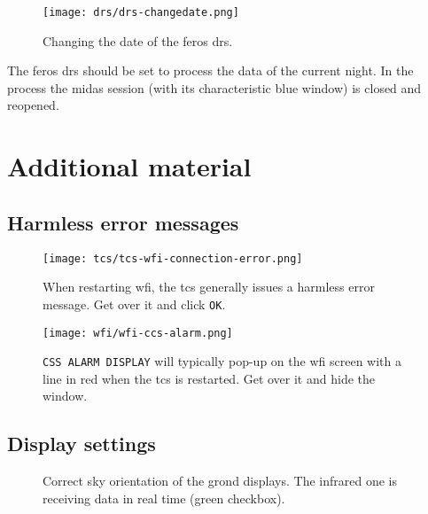\documentclass[11pt,fleqn,a4paper]{book}
\begin{document}
\begin{figure}[ht!]
\centering
\texttt{[image: drs/drs-changedate.png]}
\caption[Changing the date of FEROS DRS]{Changing the date of the \gls{feros} \gls{drs}.}
\label{fig:drsswitch}
\end{figure}
The \gls{feros} \gls{drs} should be set to process the data of the 
current night.  In the process the \gls{midas} session (with its characteristic
blue window) is closed and reopened.  

\section{Additional material}
\subsection{Harmless error messages}
\begin{figure}[ht!]
\centering
\texttt{[image: tcs/tcs-wfi-connection-error.png]}
\caption[Harmless error message of the TCS during WFI restart]{When restarting \gls{wfi}, the \gls{tcs} generally issues a harmless
error message.  Get over it and click \texttt{OK}.}
\label{fig:wfistarterror}
\end{figure}

\begin{figure}[ht!]
\centering
\texttt{[image: wfi/wfi-ccs-alarm.png]}
\caption[Harmless alarm display on WFI during TCS restart]{\texttt{CSS ALARM DISPLAY} will typically pop-up on the \gls{wfi}
screen with a line in red when the \gls{tcs} is restarted.  Get over it and
hide the window.}
\label{fig:wfialarm}
\end{figure}

\subsection{Display settings}
\begin{figure}[ht!]
\null\hfil
{}%
\hfil
{}
\hfil\null
\caption[Correct sky orientation of the GROND displays]{Correct sky orientation of the \gls{grond} displays. The infrared one
is receiving data in real time (green checkbox).}
\end{figure}

\end{document}
